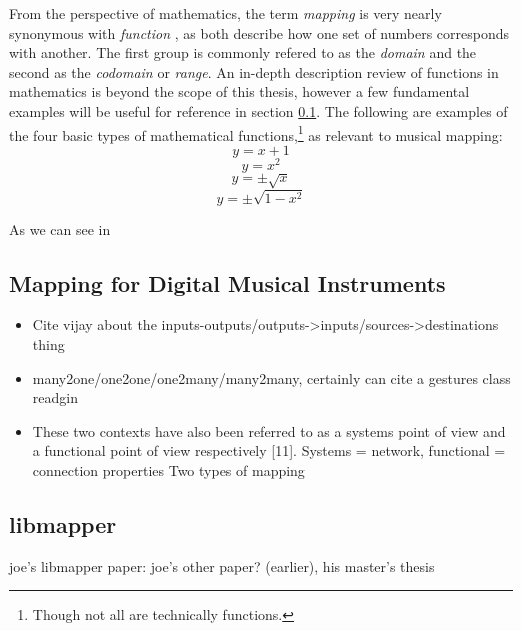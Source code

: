 	From the perspective of mathematics, the term \emph{mapping} is very nearly synonymous with \emph{function} \cite{native_set_theory}, as both describe how one set of numbers corresponds with another. The first group is commonly refered to as the \emph{domain} and the second as the \emph{codomain} or \emph{range}. An in-depth description review of functions in mathematics is beyond the scope of this thesis, however a few fundamental examples will be useful for reference in section \ref{sec:mappingforDMIs}. The following are examples of the four basic types of mathematical functions,\footnote{Though not all are technically functions.} as relevant to musical mapping:
	\begin{equation} y = x + 1 \end{equation} \label{eq:one-to-one} \vspace*{-0.7cm}
	\begin{equation} y = x^2 \end{equation} \label{eq:one-to-many} \vspace*{-0.7cm}
	\begin{equation} y = \pm\sqrt{x} \end{equation} \label{eq:many-to-one} \vspace*{-0.7cm}
	\begin{equation} y = \pm\sqrt{1 - x^2} \end{equation} \label{eq:many-to-many} \vspace*{-0.7cm}

	As we can see in 

	\subsection{Mapping for Digital Musical Instruments} \label{sec:mappingforDMIs}
		\begin{itemize}
			\item Cite vijay about the inputs-outputs/outputs->inputs/sources->destinations thing
			\item many2one/one2one/one2many/many2many, certainly can cite a gestures class readgin 
			\item These two contexts have also been referred to as a systems point of view and a functional point of view respectively [11].  Systems = network, functional = connection properties Two types of mapping \cite{two_types_of_mapping}
		\end{itemize}
	\subsection{libmapper}
		joe's libmapper paper: 
		joe's other paper? (earlier), his master's thesis
